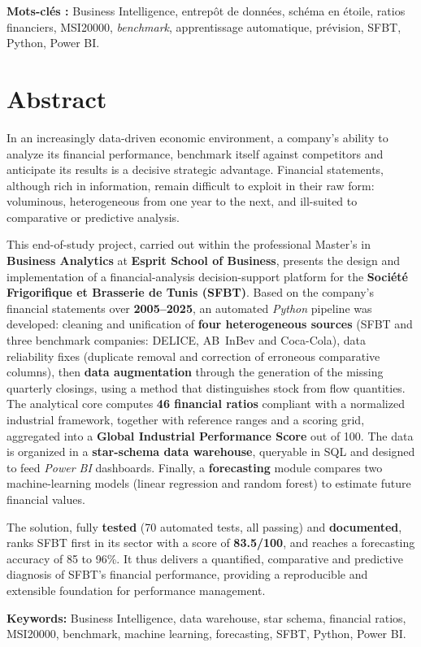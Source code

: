\vspace{0.8cm}
{\large \textbf{Mots-clés :}} Business Intelligence, entrepôt de données, schéma
en étoile, ratios financiers, MSI20000, \textit{benchmark}, apprentissage
automatique, prévision, SFBT, Python, Power BI.

\newpage

\chapter*{Abstract}

\par In an increasingly data-driven economic environment, a company's ability to
analyze its financial performance, benchmark itself against competitors and
anticipate its results is a decisive strategic advantage. Financial statements,
although rich in information, remain difficult to exploit in their raw form:
voluminous, heterogeneous from one year to the next, and ill-suited to
comparative or predictive analysis.

\par This end-of-study project, carried out within the professional Master's in
\textbf{Business Analytics} at \textbf{Esprit School of Business}, presents the
design and implementation of a financial-analysis decision-support platform for
the \textbf{Société Frigorifique et Brasserie de Tunis (SFBT)}. Based on the
company's financial statements over \textbf{2005--2025}, an automated
\textit{Python} pipeline was developed: cleaning and unification of \textbf{four
heterogeneous sources} (SFBT and three benchmark companies: DELICE, AB~InBev and
Coca-Cola), data reliability fixes (duplicate removal and correction of erroneous
comparative columns), then \textbf{data augmentation} through the generation of
the missing quarterly closings, using a method that distinguishes stock from flow
quantities. The analytical core computes \textbf{46 financial ratios} compliant
with a normalized industrial framework, together with reference ranges and a
scoring grid, aggregated into a \textbf{Global Industrial Performance Score} out
of 100. The data is organized in a \textbf{star-schema data warehouse}, queryable
in SQL and designed to feed \textit{Power BI} dashboards. Finally, a
\textbf{forecasting} module compares two machine-learning models (linear
regression and random forest) to estimate future financial values.

\par The solution, fully \textbf{tested} (70 automated tests, all passing) and
\textbf{documented}, ranks SFBT first in its sector with a score of
\textbf{83.5/100}, and reaches a forecasting accuracy of 85 to 96\%. It thus
delivers a quantified, comparative and predictive diagnosis of SFBT's financial
performance, providing a reproducible and extensible foundation for performance
management.

\vspace{0.8cm}
{\large \textbf{Keywords:}} Business Intelligence, data warehouse, star schema,
financial ratios, MSI20000, benchmark, machine learning, forecasting, SFBT,
Python, Power BI.

\newpage
